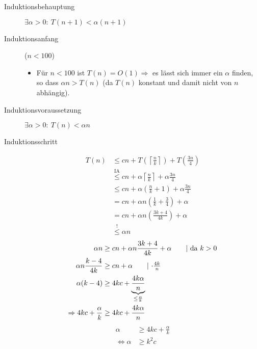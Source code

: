 \documentclass[a4paper,10pt]{scrartcl}
\begin{document}
\begin{description}
\item[Induktionsbehauptung] $\exists\alpha > 0{:}\ T(n+1) < \alpha (n+1)$
\item[Induktionsanfang] ($n < 100$)
    \begin{itemize}
     \item Für $n < 100$ ist $T(n) = O(1) \Rightarrow$ es lässt sich immer ein $\alpha$ finden, so dass $\alpha n > T(n)$ (da $T(n)$ konstant und damit nicht von $n$ abhängig).
    \end{itemize}
\item[Induktionsvoraussetzung] $\exists\alpha > 0{:}\ T(n) < \alpha n$
\item[Induktionsschritt]
\begin{align*}
 T(n)   &\leq cn + T\left(\left\lceil\frac{n}{k}\right\rceil\right) + T\left(\frac{3n}{4}\right) \\
        &\overset{\text{IA}}{\leq} cn + \alpha \left\lceil\frac{n}{k}\right\rceil + \alpha \frac{3n}{4} \\
        &\leq cn + \alpha \left(\frac{n}{k} + 1\right) + \alpha \frac{3n}{4}\\
        &= cn + \alpha n \left(\frac{1}{k} + \frac{3}{4}\right) + \alpha \\
        &= cn + \alpha n \left(\frac{3k + 4}{4k}\right) + \alpha \\
        &\overset{!}{\leq} \alpha n
\end{align*}
\begin{align*}
 \alpha n &\geq cn + \alpha n \frac{3k + 4}{4k} + \alpha \tag*{| da $k > 0$}\\
 \alpha n \frac{k - 4}{4k} &\geq cn + \alpha \tag*{| $\cdot \frac{4k}{n}$}\\
 \alpha (k - 4) &\geq 4kc + \underbrace{\frac{4k\alpha}{n}}_{\leq \frac{\alpha}{k}}\\
 \Rightarrow 4kc + \frac{\alpha}{k} &\geq 4kc + \frac{4k\alpha}{n}
\end{align*}
\begin{align*}
  \alpha &\geq 4kc + \frac{\alpha}{k} \\
  \Leftrightarrow \alpha &\geq k^2c
\end{align*}
\end{description}
\end{document}
